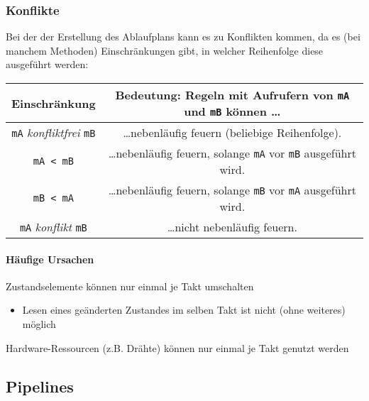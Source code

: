 			\subsubsection{Konflikte}
				Bei der der Erstellung des Ablaufplans kann es zu Konflikten kommen, da es (bei manchem Methoden) Einschränkungen gibt, in welcher Reihenfolge diese ausgeführt werden:
				\begin{table}[ht]
					\centering
					\begin{tabular}{c c}
						Einschränkung                                 & Bedeutung: Regeln mit Aufrufern von \texttt{mA} und \texttt{mB} können \dots   \\
						\hline
						\texttt{mA} \textit{konfliktfrei} \texttt{mB} & \dots nebenläufig feuern (beliebige Reihenfolge).                              \\
						\texttt{mA < mB}                              & \dots nebenläufig feuern, solange \texttt{mA} vor \texttt{mB} ausgeführt wird. \\
						\texttt{mB < mA}                              & \dots nebenläufig feuern, solange \texttt{mB} vor \texttt{mA} ausgeführt wird. \\
						\texttt{mA} \textit{konflikt} \texttt{mB}     & \dots nicht nebenläufig feuern.                                                \\
					\end{tabular}
				\end{table}

				\paragraph{Häufige Ursachen}
					\begin{description}[leftmargin = 5cm]
						\item[Rule Ordering Conflict] Zustandselemente können nur einmal je Takt umschalten
							\begin{itemize}
								\item Lesen eines geänderten Zustandes im selben Takt ist nicht (ohne weiteres) möglich
							\end{itemize}
						\item[Rule Resource Conflict] Hardware-Ressourcen (z.B. Drähte) können nur einmal je Takt genutzt werden
					\end{description}

		\subsection{Pipelines}
